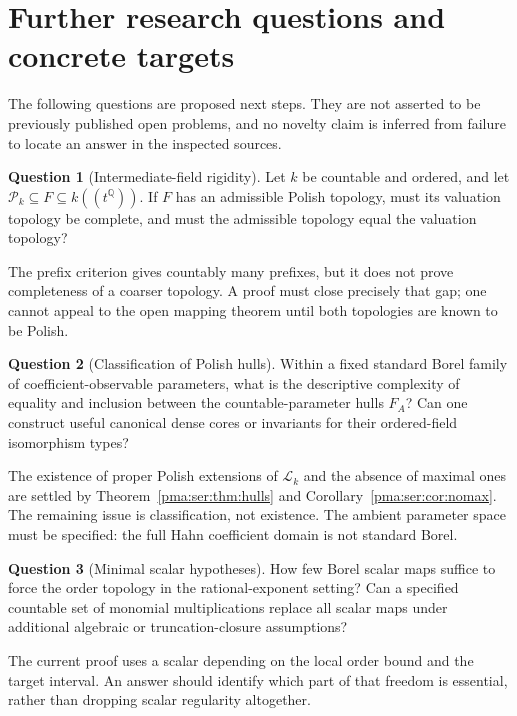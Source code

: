 \documentclass[11pt]{article}
\numberwithin{equation}{section}
\theoremstyle{definition}
\newtheorem{question}[question]{Question}
\theoremstyle{remark}
\newcommand{\Q}{\mathbb Q}
\newcommand{\Pk}{\mathcal P_k}
\newcommand{\Lk}{\mathcal L_k}
\begin{document}
\section{Further research questions and concrete targets}
\label{pma:ser:sec:questions}

The following questions are proposed next steps. They are not asserted to be
previously published open problems, and no novelty claim is inferred from
failure to locate an answer in the inspected sources.

\begin{question}[Intermediate-field rigidity]\label{pma:ser:q:intermediate}
Let $k$ be countable and ordered, and let
$\Pk\subseteq F\subseteq k((t^\Q))$.
If $F$ has an admissible Polish topology, must its valuation topology be
complete, and must the admissible topology equal the valuation topology?
\end{question}
The prefix criterion gives countably many prefixes, but it does not prove
completeness of a coarser topology. A proof must close precisely that gap;
one cannot appeal to the open mapping theorem until both topologies are known
to be Polish.

\begin{question}[Classification of Polish hulls]
Within a fixed standard Borel family of coefficient-observable parameters,
what is the descriptive complexity of equality and inclusion between the
countable-parameter hulls $F_A$? Can one construct useful canonical dense
cores or invariants for their ordered-field isomorphism types?
\end{question}
The existence of proper Polish extensions of $\Lk$ and the absence of maximal
ones are settled by Theorem~\ref{pma:ser:thm:hulls} and Corollary~\ref{pma:ser:cor:nomax}.
The remaining issue is classification, not existence. The ambient parameter
space must be specified: the full Hahn coefficient domain is not standard
Borel.

\begin{question}[Minimal scalar hypotheses]
How few Borel scalar maps suffice to force the order topology in the
rational-exponent setting? Can a specified countable set of monomial
multiplications replace all scalar maps under additional algebraic or
truncation-closure assumptions?
\end{question}
The current proof uses a scalar depending on the local order bound and the
target interval. An answer should identify which part of that freedom is
essential, rather than dropping scalar regularity altogether.
\end{document}
